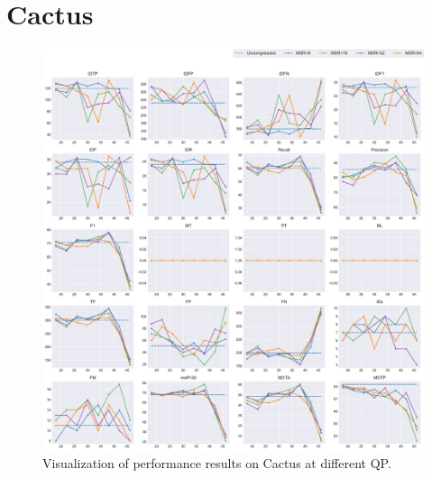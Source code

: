
\section{Cactus}
\label{sec:appendix/Cactus_all}


\begin{figure}[!htbp]
\centering
\includegraphics[width=1.0\linewidth]{img/appendix/Cactus_all_multiplots_qp.pdf}
\caption[Visualization of performance results on Cactus at different QP]
{Visualization of performance results on Cactus at different QP.}
\label{fig:Cactus_all_qp}
\end{figure}

